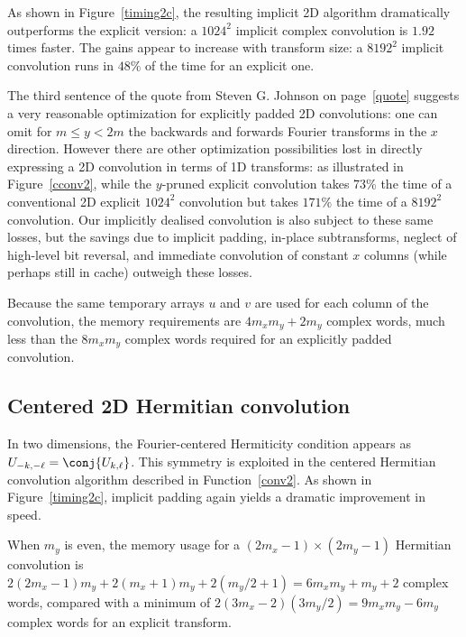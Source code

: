 \documentclass[final]{siamltex}
\begin{document}
As shown in Figure~\ref{timing2c}, the resulting implicit
2D algorithm dramatically outperforms the explicit version:
a $1024^2$ implicit complex convolution is $1.92$ times faster.
The gains appear to increase with transform size: a $8192^2$
implicit convolution runs in $48\%$ of the time for an explicit one. 

The third sentence of the quote from Steven G. Johnson on
page~\ref{quote} suggests a very reasonable optimization for
explicitly padded 2D convolutions: one can omit for $m \le y < 2m$
the backwards and forwards Fourier transforms in the $x$ direction.
However there are other optimization possibilities lost in directly
expressing a 2D convolution in terms of 1D transforms: as illustrated
in Figure~\ref{cconv2}, while the $y$-pruned explicit convolution
takes 73\% the time of a conventional 2D explicit $1024^2$ convolution
but takes $171\%$ the time of a $8192^2$
convolution. Our implicitly dealised convolution is also subject to
these same losses, but the savings due to implicit padding,
in-place subtransforms, neglect of high-level bit reversal, and
immediate convolution of constant $x$ columns (while perhaps still in
cache) outweigh these losses.

Because the same temporary arrays $u$ and $v$ are used for each column
of the convolution, the memory requirements are $4m_xm_y+2m_y$ complex
words, much less than the $8m_xm_y$ complex words required for an
explicitly padded convolution.

\subsection{Centered 2D Hermitian convolution}

In two dimensions, the Fourier-centered Hermiticity condition appears as
$U_{-k,-\ell}=\conj{U_{k,\ell}}$. 
This symmetry is exploited in the centered Hermitian convolution
algorithm described in Function~\ref{conv2}. As shown in
Figure~\ref{timing2c}, implicit padding again yields a dramatic improvement
in speed.

When $m_y$ is even, the memory usage for a $(2m_x-1)\times (2m_y-1)$ Hermitian
convolution is $2(2m_x-1)m_y+2(m_x+1)m_y+2(m_y/2+1)=6m_xm_y+m_y+2$ complex words,
compared with a minimum of $2(3m_x-2)(3m_y/2)=9m_xm_y-6m_y$ complex words for an explicit
transform.
\end{document}
